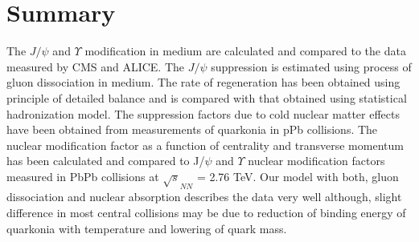 \documentclass[aps,prc,preprint,superscriptaddress,showpacs,showkeys]{revtex4-1}
\begin{document}
\section{Summary}
 The $J/\psi$ and $\Upsilon$ modification in medium are calculated and compared to the data
measured by CMS and ALICE.
  The $J/\psi$ suppression is estimated using process of gluon dissociation in medium. The rate of regeneration 
has been obtained using principle of detailed balance and is compared with that obtained using statistical 
hadronization model. 
 The suppression factors due to cold nuclear matter effects 
have been obtained from measurements of quarkonia in pPb collisions.
 The nuclear modification factor as a function of centrality and transverse momentum has been calculated  
and compared to J/$\psi$ and $\Upsilon$ nuclear modification factors measured in PbPb collisions 
at $\sqrt s_{NN}$ =  2.76 TeV.
  Our model with both, gluon dissociation and nuclear absorption describes the data very well although, 
slight difference in most central collisions may be due to reduction of binding energy of quarkonia with temperature 
and lowering of quark mass.
\end{document}
